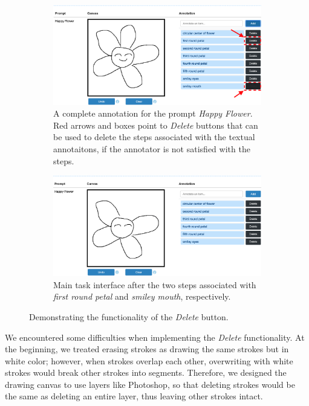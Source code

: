 \begin{figure}[!htb]
\begin{subfigure}{\textwidth}
    \centering
    \includegraphics[width=.8\linewidth]{data_collection/v1_before_delete.png}  
    \caption{A complete annotation for the prompt \textit{Happy Flower}. Red arrows and boxes point to \textit{Delete} buttons that can be used to delete the steps associated with the textual annotaitons, if the annotator is not satisfied with the steps.}
    \label{v1.main_task.delete.a}
\end{subfigure}
\newline
\begin{subfigure}{\textwidth}
    \centering
    \includegraphics[width=.8\linewidth]{data_collection/v1_after_delete.png}  
    \caption{Main task interface after the two steps associated with \textit{first round petal} and \textit{smiley mouth}, respectively.}
    \label{v1.main_task.delete.b}
\end{subfigure}
\caption{Demonstrating the functionality of the \textit{Delete} button.}
\label{v1.main_task.delete}
\end{figure}

We encountered some difficulties when implementing the \textit{Delete} functionality. At the beginning, we treated erasing strokes as drawing the same strokes but in white color; however, when strokes overlap each other, overwriting with white strokes would break other strokes into segments. Therefore, we designed the drawing canvas to use layers like Photoshop, so that deleting strokes would be the same as deleting an entire layer, thus leaving other strokes intact.   

